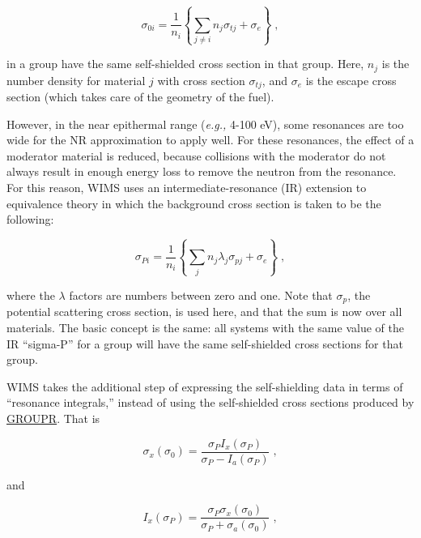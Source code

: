 \begin{equation}
   \sigma_{0i}=\frac{1}{n_i}\left\{\sum_{j\ne i} n_j\sigma_{tj}
       +\sigma_e\right\}\;,
\end{equation}

\noindent
in a group have the same self-shielded cross section in that
group.  Here, $n_j$ is the number density for material $j$
with cross section $\sigma_{tj}$, and $\sigma_e$ is the escape
cross section (which takes care of the geometry of the fuel).

However, in the near epithermal range ({\it e.g.,} 4-100 eV),
some resonances are too wide for the NR approximation to apply
well.  For these resonances,
the effect of a moderator material is reduced, because collisions
with the moderator do not always result in enough energy loss
to remove the neutron from the resonance.  For this reason, WIMS
uses an intermediate-resonance (IR) extension to equivalence theory in which the background
cross section is taken to be the following:

\begin{equation}
   \sigma_{Pi}=\frac{1}{n_i}\left\{\sum_{j} n_j
       \lambda_j\sigma_{pj} +\sigma_e\right\}\;,
\end{equation}
\vspace{0.5 pt}

\noindent
where the $\lambda$ factors are numbers between
zero and one.  Note that $\sigma_p$, the potential scattering cross
section, is used here, and that the sum is now over all materials.
The basic concept is the same:  all systems with the same
value of the IR ``sigma-P'' for a group will have the same
self-shielded cross sections for that group.

WIMS takes the additional step of expressing the self-shielding
data in terms of ``resonance integrals,''
instead of using the self-shielded cross sections produced by
\hyperlink{sGROUPRhy}{GROUPR}.  That is

\begin{equation}
   \sigma_x(\sigma_0)=\frac{\sigma_P I_x(\sigma_P)}
      {\sigma_P - I_a(\sigma_P)}\;,
\end{equation}
\vspace{0.5 pt}

\noindent
and

\begin{equation}
   I_x(\sigma_P)=\frac{\sigma_P\sigma_x(\sigma_0)}
     {\sigma_P + \sigma_a(\sigma_0)}\;,
\end{equation}
\vspace{0.5 pt}

